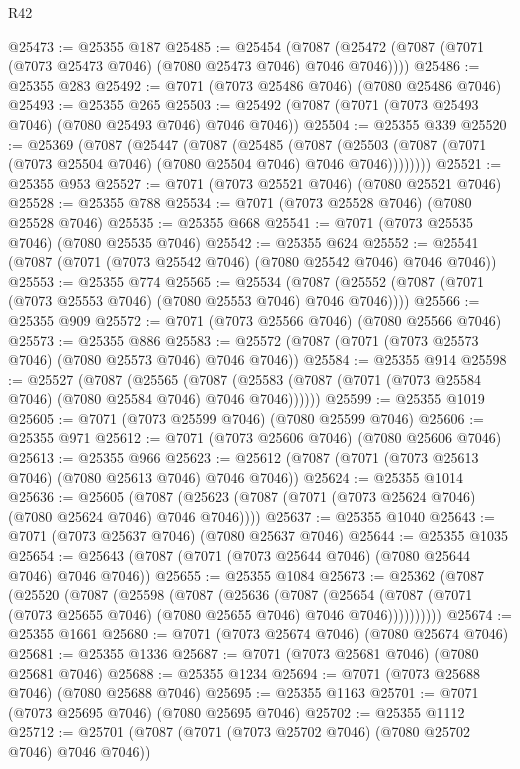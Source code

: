 \begin{lexlean}{R42}
\begin{coremodule}
{@25473 := @25355 @187
@25485 := @25454
    (@7087 (@25472 (@7087 (@7071 (@7073 @25473 @7046) (@7080 @25473 @7046) @7046 @7046))))
@25486 := @25355 @283
@25492 := @7071 (@7073 @25486 @7046) (@7080 @25486 @7046)
@25493 := @25355 @265
@25503 := @25492 (@7087 (@7071 (@7073 @25493 @7046) (@7080 @25493 @7046) @7046 @7046))
@25504 := @25355 @339
@25520 := @25369
    (@7087
      (@25447
        (@7087
          (@25485
            (@7087
              (@25503 (@7087 (@7071 (@7073 @25504 @7046) (@7080 @25504 @7046) @7046 @7046))))))))
@25521 := @25355 @953
@25527 := @7071 (@7073 @25521 @7046) (@7080 @25521 @7046)
@25528 := @25355 @788
@25534 := @7071 (@7073 @25528 @7046) (@7080 @25528 @7046)
@25535 := @25355 @668
@25541 := @7071 (@7073 @25535 @7046) (@7080 @25535 @7046)
@25542 := @25355 @624
@25552 := @25541 (@7087 (@7071 (@7073 @25542 @7046) (@7080 @25542 @7046) @7046 @7046))
@25553 := @25355 @774
@25565 := @25534
    (@7087 (@25552 (@7087 (@7071 (@7073 @25553 @7046) (@7080 @25553 @7046) @7046 @7046))))
@25566 := @25355 @909
@25572 := @7071 (@7073 @25566 @7046) (@7080 @25566 @7046)
@25573 := @25355 @886
@25583 := @25572 (@7087 (@7071 (@7073 @25573 @7046) (@7080 @25573 @7046) @7046 @7046))
@25584 := @25355 @914
@25598 := @25527
    (@7087
      (@25565
        (@7087 (@25583 (@7087 (@7071 (@7073 @25584 @7046) (@7080 @25584 @7046) @7046 @7046))))))
@25599 := @25355 @1019
@25605 := @7071 (@7073 @25599 @7046) (@7080 @25599 @7046)
@25606 := @25355 @971
@25612 := @7071 (@7073 @25606 @7046) (@7080 @25606 @7046)
@25613 := @25355 @966
@25623 := @25612 (@7087 (@7071 (@7073 @25613 @7046) (@7080 @25613 @7046) @7046 @7046))
@25624 := @25355 @1014
@25636 := @25605
    (@7087 (@25623 (@7087 (@7071 (@7073 @25624 @7046) (@7080 @25624 @7046) @7046 @7046))))
@25637 := @25355 @1040
@25643 := @7071 (@7073 @25637 @7046) (@7080 @25637 @7046)
@25644 := @25355 @1035
@25654 := @25643 (@7087 (@7071 (@7073 @25644 @7046) (@7080 @25644 @7046) @7046 @7046))
@25655 := @25355 @1084
@25673 := @25362
    (@7087
      (@25520
        (@7087
          (@25598
            (@7087
              (@25636
                (@7087
                  (@25654
                    (@7087 (@7071 (@7073 @25655 @7046) (@7080 @25655 @7046) @7046 @7046))))))))))
@25674 := @25355 @1661
@25680 := @7071 (@7073 @25674 @7046) (@7080 @25674 @7046)
@25681 := @25355 @1336
@25687 := @7071 (@7073 @25681 @7046) (@7080 @25681 @7046)
@25688 := @25355 @1234
@25694 := @7071 (@7073 @25688 @7046) (@7080 @25688 @7046)
@25695 := @25355 @1163
@25701 := @7071 (@7073 @25695 @7046) (@7080 @25695 @7046)
@25702 := @25355 @1112
@25712 := @25701 (@7087 (@7071 (@7073 @25702 @7046) (@7080 @25702 @7046) @7046 @7046))
}
\end{coremodule}
\end{lexlean}
